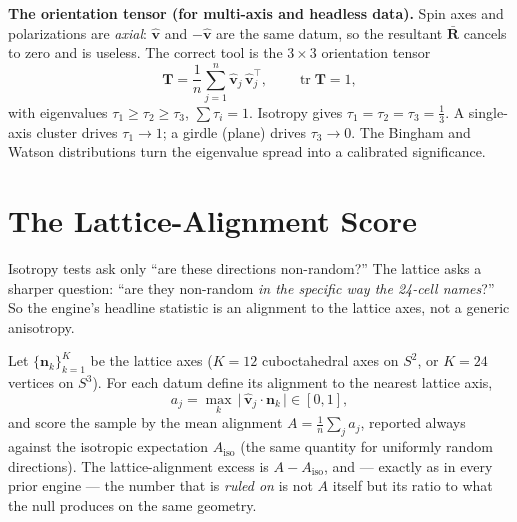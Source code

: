 \documentclass[11pt, letterpaper, openany]{book}
\newcommand{\uvec}[1]{\hat{\mathbf{#1}}}
\newcommand{\Rbar}{\bar{\mathbf{R}}}
\begin{document}
\begin{derivbox}
\textbf{The orientation tensor (for multi-axis and headless data).} Spin axes and polarizations are
\emph{axial}: $\uvec{v}$ and $-\uvec{v}$ are the same datum, so the resultant $\Rbar$ cancels to zero and
is useless. The correct tool is the $3\times3$ orientation tensor
\[
\mathbf{T} = \frac{1}{n}\sum_{j=1}^{n} \uvec{v}_j\,\uvec{v}_j^{\!\top},
\qquad \operatorname{tr}\mathbf{T}=1,
\]
with eigenvalues $\tau_1 \ge \tau_2 \ge \tau_3$, $\sum\tau_i = 1$. Isotropy gives
$\tau_1=\tau_2=\tau_3=\tfrac13$. A single-axis cluster drives $\tau_1 \to 1$; a girdle (plane) drives
$\tau_3 \to 0$. The Bingham and Watson distributions \cite{mardia2000} turn the eigenvalue spread into a
calibrated significance.
\end{derivbox}

\section{The Lattice-Alignment Score}

Isotropy tests ask only ``are these directions non-random?'' The lattice asks a sharper question: ``are
they non-random \emph{in the specific way the 24-cell names}?'' So the engine's headline statistic is an
alignment to the lattice axes, not a generic anisotropy.

\begin{derivbox}
Let $\{\mathbf{n}_k\}_{k=1}^{K}$ be the lattice axes ($K=12$ cuboctahedral axes on $S^2$, or $K=24$
vertices on $S^3$). For each datum define its alignment to the nearest lattice axis,
\[
a_j = \max_{k}\, \big|\,\uvec{v}_j \cdot \mathbf{n}_k\,\big| \in [0,1],
\]
and score the sample by the mean alignment $A = \tfrac{1}{n}\sum_j a_j$, reported always against the
isotropic expectation $A_{\mathrm{iso}}$ (the same quantity for uniformly random directions). The
lattice-alignment excess is $A - A_{\mathrm{iso}}$, and --- exactly as in every prior engine --- the
number that is \emph{ruled on} is not $A$ itself but its ratio to what the null produces on the same
geometry.
\end{derivbox}
\end{document}
